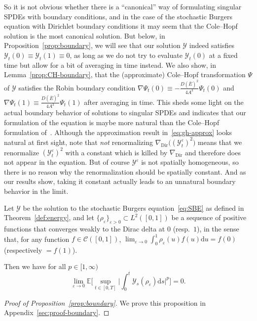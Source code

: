 \documentclass[AHL,Unicode,longabstracts]{cedram}
\DeclareMathOperator{\Dir}{Dir}
\newcommand{\mc}[1]{{\mathcal #1}}
\renewcommand{\mc}[1]{{\mathcal #1}}
\renewcommand{\bar}{\overline}
\newcommand*{\dd}{\mathrm{d}}
\newcommand*{\ds}{\dd s}
\newcommand*{\du}{\dd u}
\renewcommand{\tfrac}{\frac}
\begin{document}
So it is not obvious whether there is a ``canonical'' way of formulating singular SPDEs with boundary conditions, and in the case of the stochastic Burgers equation with Dirichlet boundary conditions it may seem that the Cole--Hopf solution is the most canonical solution. But below, in Proposition~\ref{prop:boundary}, we will see that our solution $\mc Y$ indeed satisfies $\mc Y_t(0) \equiv \mc Y_t(1) \equiv 0$, as long as we do not try to evaluate $\mc Y_t(0)$ at a fixed time but allow for a bit of averaging in time instead. We also show, in Lemma~\ref{prop:CH-boundary}, that the (approximate) Cole--Hopf transformation $\Psi$ of $\mc Y$ satisfies the Robin boundary condition $\nabla \Psi_t(0) \equiv - \tfrac{D(\bar{E})^2}{4A^3} \Psi_t(0)$ and $\nabla \Psi_t(1) \equiv \tfrac{D(\bar{E})^2}{4A^3} \Psi_t(1)$ after averaging in time. This sheds some light on the actual boundary behavior of solutions to singular SPDEs and indicates that our formulation of the equation is maybe more natural than the Cole--Hopf formulation of~\cite{Corwin2016}. Although the approximation result in~\eqref{eq:gh-approx} looks natural at first sight, note that \emph{not} renormalizing $ \nabla_{\Dir} \big((\mc Y^\varepsilon_t)^2\big)$ means that we renormalize $(\mc Y^\varepsilon_t)^2$ with a constant which is killed by $\nabla_{\Dir}$ and therefore does not appear in the equation. But of course $\mc Y^\varepsilon$ is not spatially homogeneous, so there is no reason why the renormalization should be spatially constant. And as our results show, taking it constant actually leads to an unnatural boundary behavior in the limit.

\begin{prop}\label{prop:boundary}
Let $\mc Y$ be the solution to the stochastic Burgers equation~\eqref{eq:SBE} as defined in Theorem~\ref{def:energy}, and let $\{\rho_{\varepsilon}\}_{\varepsilon >0} \subset L^2 ([0, 1])$ be a sequence of positive functions that converges weakly to the Dirac delta at $0$ (resp.~$1$), in the sense that, for any function $f \in \mc C ([0, 1])$, $\lim_{\varepsilon
\rightarrow 0} \int_0^1\rho_{\varepsilon}(u) f(u)\du = f (0)$ (respectively $= f (1)$).


Then we have for all $p \in [1, \infty)$
\[
\lim_{\varepsilon \rightarrow 0} \mathbb{E} \bigg[\sup_{t \in [0,T]}
\bigg| \int_0^t \mc Y_s (\rho_{\varepsilon}) \ds \bigg|^p \bigg] = 0.
\]
\end{prop}

\begin{proof}[Proof of Proposition~\ref{prop:boundary}]
We prove this proposition in Appendix~\ref{sec:proof-boundary}.
\end{proof}
\end{document}
